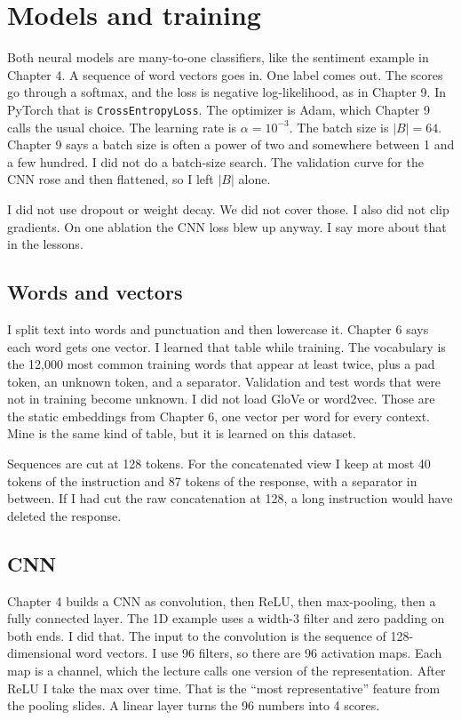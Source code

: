 \documentclass[11pt]{article}
\begin{document}
\section{Models and training}
\label{sec:models}

Both neural models are many-to-one classifiers, like the sentiment example in Chapter 4. A sequence of word vectors goes in. One label comes out. The scores go through a softmax, and the loss is negative log-likelihood, as in Chapter 9. In PyTorch that is \texttt{CrossEntropyLoss}. The optimizer is Adam, which Chapter 9 calls the usual choice. The learning rate is $\alpha = 10^{-3}$. The batch size is $|B| = 64$. Chapter 9 says a batch size is often a power of two and somewhere between 1 and a few hundred. I did not do a batch-size search. The validation curve for the CNN rose and then flattened, so I left $|B|$ alone.

I did not use dropout or weight decay. We did not cover those. I also did not clip gradients. On one ablation the CNN loss blew up anyway. I say more about that in the lessons.

\subsection{Words and vectors}

I split text into words and punctuation and then lowercase it. Chapter 6 says each word gets one vector. I learned that table while training. The vocabulary is the 12,000 most common training words that appear at least twice, plus a pad token, an unknown token, and a separator. Validation and test words that were not in training become unknown. I did not load GloVe or word2vec. Those are the static embeddings from Chapter 6, one vector per word for every context. Mine is the same kind of table, but it is learned on this dataset.

Sequences are cut at 128 tokens. For the concatenated view I keep at most 40 tokens of the instruction and 87 tokens of the response, with a separator in between. If I had cut the raw concatenation at 128, a long instruction would have deleted the response.

\subsection{CNN}

Chapter 4 builds a CNN as convolution, then ReLU, then max-pooling, then a fully connected layer. The 1D example uses a width-3 filter and zero padding on both ends. I did that. The input to the convolution is the sequence of 128-dimensional word vectors. I use 96 filters, so there are 96 activation maps. Each map is a channel, which the lecture calls one version of the representation. After ReLU I take the max over time. That is the ``most representative'' feature from the pooling slides. A linear layer turns the 96 numbers into 4 scores.
\end{document}
